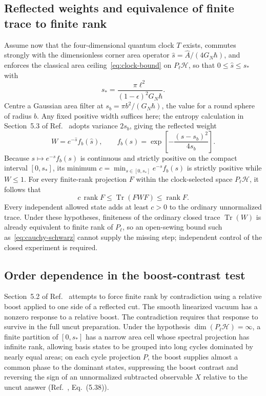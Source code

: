 \documentclass[10pt,a4paper]{article}
\numberwithin{equation}{section}
\newcommand{\tr}{\operatorname{Tr}}
\newcommand{\rank}{\operatorname{rank}}
\newcommand{\HH}{\mathcal{H}}
\begin{document}
\subsection{Reflected weights and equivalence of finite trace to finite rank}

Assume now that the four-dimensional quantum clock $T$ exists, commutes strongly with the dimensionless corner area operator $\hat{s}=\hat{A}/(4G_N\hbar)$, and enforces the classical area ceiling~\eqref{eq:clock-bound} on $P_\ell\HH$, so that $0\le \hat{s}\le s_*$ with
\begin{equation}
  s_* = \frac{\pi\ell^2}{(1-\epsilon)^2 G_N\hbar}.
  \label{eq:s-max}
\end{equation}
Centre a Gaussian area filter at $s_b = \pi b^2/(G_N\hbar)$, the value for a round sphere of radius $b$.
Any fixed positive width suffices here; the entropy calculation in Section~5.3 of Ref.~\cite{Chandrasekaran2026} adopts variance $2s_b$, giving the reflected weight
\begin{equation}
  W = e^{-\hat{s}} f_b(\hat{s}), \qquad
  f_b(s) = \exp\!\left[-\frac{(s-s_b)^2}{4s_b}\right].
  \label{eq:reflected-weight}
\end{equation}
Because $s\mapsto e^{-s}f_b(s)$ is continuous and strictly positive on the compact interval $[0,s_*]$, its minimum $c = \min_{s\in[0,s_*]} e^{-s}f_b(s)$ is strictly positive while $W\le 1$.
For every finite-rank projection $F$ within the clock-selected space $P_\ell\HH$, it follows that
\begin{equation}
  c\,\rank F \le \tr(FWF) \le \rank F.
  \label{eq:trace-rank}
\end{equation}
Every independent allowed state adds at least $c>0$ to the ordinary unnormalized trace.
Under these hypotheses, finiteness of the ordinary closed trace $\tr(W)$ is already equivalent to finite rank of $P_\ell$, so an open-sewing bound such as~\eqref{eq:cauchy-schwarz} cannot supply the missing step; independent control of the closed experiment is required.

\subsection{Order dependence in the boost-contrast test}

Section~5.2 of Ref.~\cite{Chandrasekaran2026} attempts to force finite rank by contradiction using a relative boost applied to one side of a reflected cut.
The smooth linearized vacuum has a nonzero response to a relative boost. The contradiction requires that response to survive in the full uncut preparation.
Under the hypothesis $\dim(P_\ell\HH)=\infty$, a finite partition of $[0,s_*]$ has a narrow area cell whose spectral projection has infinite rank, allowing basis states to be grouped into long cycles dominated by nearly equal areas; on each cycle projection $P$, the boost supplies almost a common phase to the dominant states, suppressing the boost contrast and reversing the sign of an unnormalized subtracted observable $X$ relative to the uncut answer (Ref.~\cite{Chandrasekaran2026}, Eq.~(5.38)).
\end{document}
